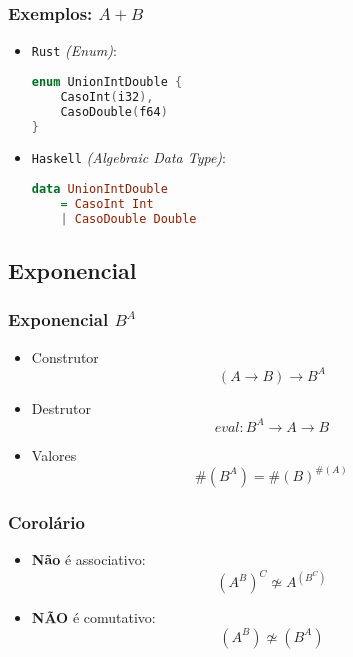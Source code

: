 \documentclass{beamer}
\newcommand{\lang}[1]{\texttt{#1}}
\newcommand{\typetam}{\#}
\newcommand{\typesim}{\simeq}
\begin{document}
\begin{frame}[fragile]
    \frametitle{Exemplos: \(A + B\)}
    \begin{itemize}
        \item \lang{Rust} \emph{(Enum)}:
            \begin{lstlisting}[language=C]
enum UnionIntDouble {
    CasoInt(i32),
    CasoDouble(f64)
}
            \end{lstlisting}
            \vfill
        \item \lang{Haskell} \emph{(Algebraic Data Type)}:
            \begin{lstlisting}[language=Haskell]
data UnionIntDouble
    = CasoInt Int
    | CasoDouble Double
            \end{lstlisting}
    \end{itemize}
\end{frame}

\subsection{Exponencial}
\begin{frame}
    \frametitle{Exponencial \(B^A\)}
    \begin{itemize}
        \item Construtor
            \[
                (A \to B) \to B^A
            \]
            \vfill
        \item Destrutor
            \[
                eval : B^A \to A \to B
            \]
            \vfill
        \item Valores
            \[
                \typetam\left(B^A\right) = \typetam(B)^{\typetam(A)}
            \]
    \end{itemize}
\end{frame}

\begin{frame}
    \frametitle{Corolário}
    \begin{itemize}
        \item \textbf{Não} é associativo:
            \[
                \left(A^B\right)^C \not\typesim A^{\left(B^C\right)}
            \]
            \vfill
        \item \textbf{NÃO} é comutativo:
            \[
                \left(A^B\right) \not\typesim \left(B^A\right)
            \]
    \end{itemize}
\end{frame}
\end{document}
